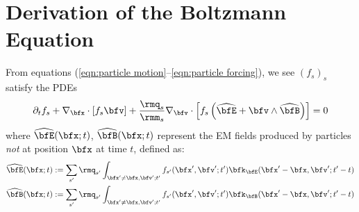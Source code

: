 \chapter{Derivation of the Boltzmann Equation}\label{cha:Boltzmann equation derivation}
    From equations (\ref{eqn:particle motion}--\ref{eqn:particle forcing}), we see $(f_{s})_{s}$ satisfy the PDEs
    \begin{equation}\label{eqn:exact Boltzmann equation}
        \partial_{t}f_{s} + \nabla_{\bfx}\cdot[f_{s}\bfv] + \frac{\rmq_{s}}{\rmm_{s}}\nabla_{\bfv}\cdot\left[f_{s}\left(\widehat{\bfE} + \bfv\wedge\widehat{\bfB}\right)\right]  =  0
    \end{equation}
    where $\widehat{\bfE}(\bfx; t)$, $\widehat{\bfB}(\bfx; t)$ represent the EM fields produced by particles \emph{not} at position $\bfx$ at time $t$, defined as:
    \begin{align}
        \widehat{\bfE}(\bfx; t)  &:=  \sum_{s'}\rmq_{s'}\int_{\bfx' \neq \bfx, \bfv'; t'}f_{s'}(\bfx', \bfv'; t')\bfk_{\bfE}(\bfx' - \bfx, \bfv'; t' - t)  \\
        \widehat{\bfB}(\bfx; t)  &:=  \sum_{s'}\rmq_{s'}\int_{\bfx' \neq \bfx, \bfv'; t'}f_{s'}(\bfx', \bfv'; t')\bfk_{\bfB}(\bfx' - \bfx, \bfv'; t' - t)
    \end{align}

